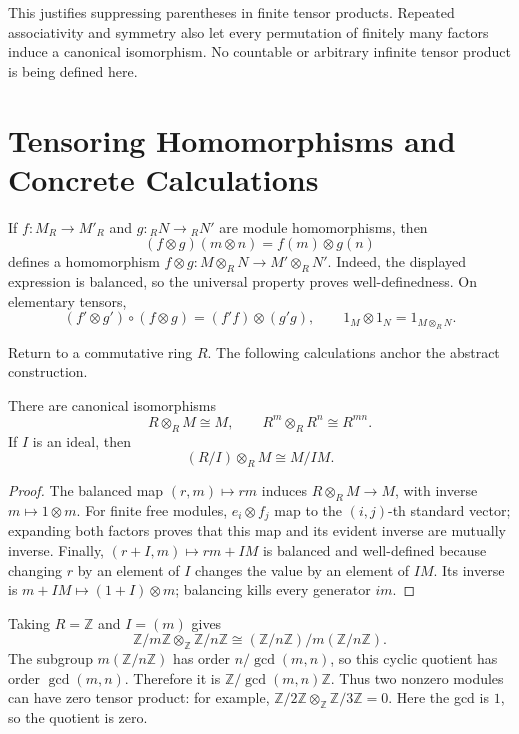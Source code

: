 This justifies suppressing parentheses in finite tensor products. Repeated
associativity and symmetry also let every permutation of finitely many factors
induce a canonical isomorphism. No countable or arbitrary infinite tensor
product is being defined here.

\section{Tensoring Homomorphisms and Concrete Calculations}\label{sec:tensor-maps-calculations}
If \(f:M_R\to M'_R\) and \(g:{}_RN\to{}_RN'\) are module homomorphisms, then
\[
(f\otimes g)(m\otimes n)=f(m)\otimes g(n)
\]
defines a homomorphism \(f\otimes g:M\otimes_RN\to M'\otimes_RN'\).
Indeed, the displayed expression is balanced, so the universal property
proves well-definedness. On elementary tensors,
\[
(f'\otimes g')\circ(f\otimes g)=(f'f)\otimes(g'g),
\qquad
1_M\otimes1_N=1_{M\otimes_RN}.
\]

Return to a commutative ring \(R\). The following calculations anchor the
abstract construction.

\begin{proposition}\label{prop:tensor-calculations}
There are canonical isomorphisms
\[
R\otimes_RM\cong M,
\qquad
R^m\otimes_RR^n\cong R^{mn}.
\]
If \(I\) is an ideal, then
\[
(R/I)\otimes_RM\cong M/IM.
\]
\end{proposition}
\begin{proof}
The balanced map \((r,m)\mapsto rm\) induces \(R\otimes_RM\to M\), with
inverse \(m\mapsto1\otimes m\). For finite free modules, \(e_i\otimes f_j\)
map to the \((i,j)\)-th standard vector; expanding both factors proves that
this map and its evident inverse are mutually inverse. Finally,
\((r+I,m)\mapsto rm+IM\) is balanced and well-defined because changing \(r\)
by an element of \(I\) changes the value by an element of \(IM\). Its inverse
is \(m+IM\mapsto(1+I)\otimes m\); balancing kills every generator \(im\).
\end{proof}

\begin{example}
Taking \(R=\mathbb Z\) and \(I=(m)\) gives
\[
\mathbb Z/m\mathbb Z\otimes_{\mathbb Z}\mathbb Z/n\mathbb Z
\cong(\mathbb Z/n\mathbb Z)/m(\mathbb Z/n\mathbb Z).
\]
The subgroup \(m(\mathbb Z/n\mathbb Z)\) has order
\(n/\gcd(m,n)\), so this cyclic quotient has order \(\gcd(m,n)\).
Therefore it is \(\mathbb Z/\gcd(m,n)\mathbb Z\).
Thus two nonzero modules can have zero tensor product: for example,
\(\mathbb Z/2\mathbb Z\otimes_{\mathbb Z}\mathbb Z/3\mathbb Z=0\).
Here the gcd is \(1\), so the quotient is zero.
\end{example}

